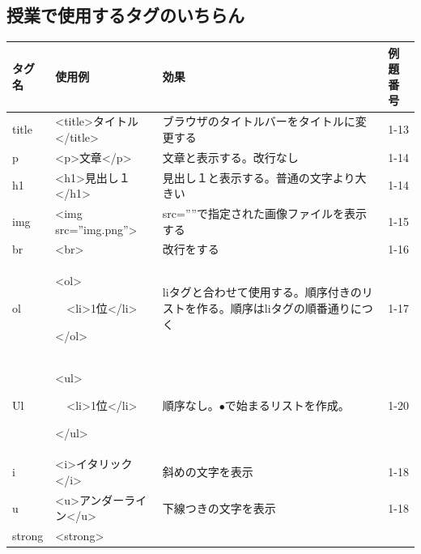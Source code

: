 \documentclass[a4paper,12pt]{jarticle}
\begin{document}
\clearpage\subsection{授業で使用するタグのいちらん}
{\small
  \begin{center}
    \tablefirsthead{}
    \tablehead{}
    \tabletail{}
    \tablelasttail{}
    \begin{supertabular}{|m{2.171cm}|m{4.1060004cm}|m{7.8930006cm}|m{2.037cm}|}
      \hline
      タグ名 &
      使用例 &
      効果 &
      例題番号\\\hline
      title &
      {\textless}title{\textgreater}タイトル{\textless}/title{\textgreater} &
      ブラウザのタイトルバーをタイトルに変更する
      &
      1-13\\\hline
      p &
      {\textless}p{\textgreater}文章{\textless}/p{\textgreater} &
      文章と表示する。改行なし &
      1-14\\\hline
      h1 &
      {\textless}h1{\textgreater}見出し１{\textless}/h1{\textgreater} &
      見出し１と表示する。普通の文字より大きい
      &
      1-14\\\hline
      img &
      {\textless}img src=”img.png”{\textgreater} &
      src=””で指定された画像ファイルを表示する
      &
      1-15\\\hline
      br &
      {\textless}br{\textgreater} &
      改行をする &
      1-16\\\hline
      ol &
      {\textless}ol{\textgreater}

      \ \ {\textless}li{\textgreater}1位{\textless}/li{\textgreater}

      {\textless}/ol{\textgreater} &
      liタグと合わせて使用する。順序付きのリストを作る。順序はliタグの順番通りにつく
      &
      1-17\\\hline
      Ul &
      {\textless}ul{\textgreater}

      \ \ {\textless}li{\textgreater}1位{\textless}/li{\textgreater}

      {\textless}/ul{\textgreater} &
      順序なし。${\bullet}で始まるリストを作成。$
      &
      1-20\\\hline
      i &
      {\textless}i{\textgreater}イタリック{\textless}/i{\textgreater} &
      斜めの文字を表示 &
      1-18\\\hline
      u &
      {\textless}u{\textgreater}アンダーライン{\textless}/u{\textgreater} &
      下線つきの文字を表示 &
      1-18\\\hline
      strong &
      {\textless}strong{\textgreater}


\end{supertabular}
\end{center}}
\end{document}
